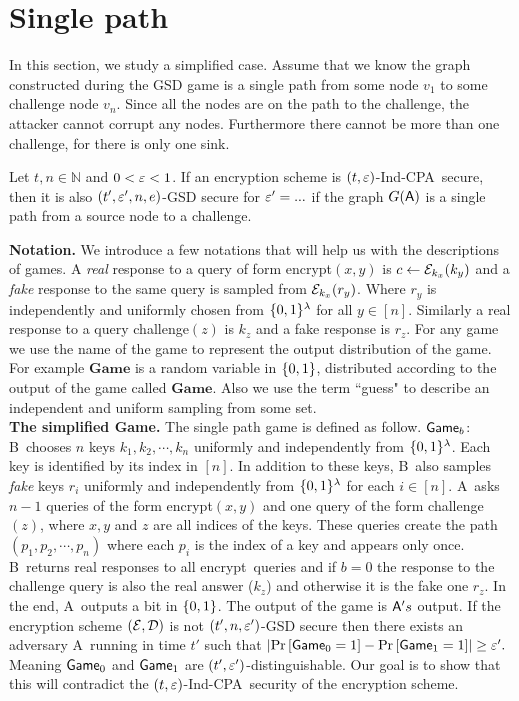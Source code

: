 \documentclass{article}
\newcommand{\tcpa}{$(t,\eps)$-Ind-CPA}
\def\B{{\sf B}}
\def\A{{\sf A}}
\def\E{{\cal E}}
\def\D{{\cal D}}
\newcommand{\encrypt}{{\sf encrypt}}
\newcommand{\game}{{\sf Game}}
\newcommand{\dgame}{{\mathbf{Game}}}
\def\challenge{{\sf challenge}}
\begin{document}
\fi
\section{Single path} %

In this section, we study a simplified case. Assume that we know the graph constructed during the GSD game is a single path from some node $v_1$ to some challenge node $v_n$. Since all the nodes are on the path to the challenge, the attacker cannot corrupt any nodes. Furthermore there cannot be more than one challenge, for there is only one sink. \\

\begin{theorem}
Let $t,n \in \mathbb{N}$  and $0<\varepsilon<1$. If an encryption scheme is \tcpa~secure, then it is also $(t',\varepsilon',n,e)$-GSD secure for $\varepsilon'= ...$ if the graph $G(\A)$ is a single path from a source node to a challenge.
\end{theorem}

\noindent \textbf{Notation.} We introduce a few notations that will help us with the descriptions of games. A \textit{real} response to a query of form \encrypt$(x,y)$ is $c\leftarrow \E_{k_x}(k_{y})$ and a \textit{fake} response to the same query is sampled from $\E_{k_x}(r_{y})$. Where $r_y$ is independently and uniformly chosen from $\{0,1\}^\lambda$ for all $y\in [n]$. Similarly a real response to a query \challenge$(z)$ is $k_z$ and a fake response is $r_z$. For any game we use the name of the game to represent the output distribution of the game. For example $\dgame$ is a random variable in $\{0,1\}$, distributed according to the output of the game called $\dgame$. Also we use the term ``guess" to describe an independent and uniform sampling from some set.\\

\noindent \textbf{The simplified Game.} The single path game is defined as follow. $\game_b$: \B~chooses $n$ keys $k_1,k_2,\cdots,k_n$ uniformly and independently from $\{0,1\}^\lambda$. Each key is identified by its index in $[n]$. In addition to these keys, \B~also samples \textit{fake} keys $r_i$ uniformly and independently from $\{0,1\}^\lambda$ for each $i\in [n]$. \A~asks $n-1$ queries of the form \encrypt$(x,y)$ and one query of the form \challenge$(z)$, where $x,y$ and $z$ are all indices of the keys. These queries create the path $(p_1,p_2,\cdots, p_n)$ where each $p_i$ is the index of a key and appears only once.  \B~returns real responses to all \encrypt~queries and if $b=0$ the response to the challenge query is also the real answer ($k_{z}$) and otherwise it is the fake one $r_{z}$. In the end, \A~outputs a bit in $\{0,1\}$. The output of the game is $\A's$ output. If the encryption scheme $(\E,\D)$ is not $(t',n,\varepsilon')$-GSD secure then there exists an adversary \A~running in time $t'$ such that
$\abs{\prob{\game_0=1}-\prob{\game_1=1}}\geq \eps'.$
Meaning $\game_0$ and $\game_1$ are $(t',\varepsilon')$-distinguishable. Our goal is to show that this will contradict the \tcpa~security of the encryption scheme. \\
\end{document}
